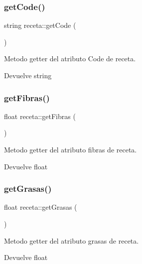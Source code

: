 \subsubsection{\texorpdfstring{get\+Code()}{getCode()}}
{\footnotesize\ttfamily string receta\+::get\+Code (\begin{DoxyParamCaption}{ }\end{DoxyParamCaption})}



Metodo getter del atributo Code de receta. 

\begin{DoxyReturn}{Devuelve}
string 
\end{DoxyReturn}
\mbox{\label{classreceta_a13819688407b0e6927a295cee0948cef}} 
\subsubsection{\texorpdfstring{get\+Fibras()}{getFibras()}}
{\footnotesize\ttfamily float receta\+::get\+Fibras (\begin{DoxyParamCaption}{ }\end{DoxyParamCaption})}



Metodo getter del atributo fibras de receta. 

\begin{DoxyReturn}{Devuelve}
float 
\end{DoxyReturn}
\mbox{\label{classreceta_ab1c63c527e92f4a525a1288e68f6d895}} 
\subsubsection{\texorpdfstring{get\+Grasas()}{getGrasas()}}
{\footnotesize\ttfamily float receta\+::get\+Grasas (\begin{DoxyParamCaption}{ }\end{DoxyParamCaption})}



Metodo getter del atributo grasas de receta. 

\begin{DoxyReturn}{Devuelve}
float 
\end{DoxyReturn}
\mbox{\label{classreceta_a4e18d86d43f1550fc3f79e925dd3dbac}} 
